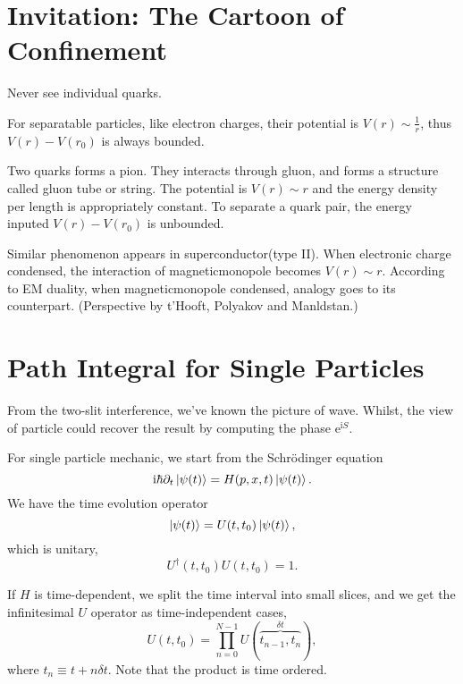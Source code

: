 \section{Invitation: The Cartoon of Confinement}
Never see individual quarks.

For separatable particles, like electron charges, their potential is 
$V(r) \sim \frac{1}{r}$, thus $V(r)-V(r_0)$ is always bounded.

Two quarks forms a pion. They interacts through gluon, and forms a structure called gluon tube or string. The potential is $V(r) \sim r$ and the energy density per length is appropriately constant. To separate a quark pair, the energy inputed $V(r)-V(r_0)$ is unbounded.

Similar phenomenon appears in superconductor(type II). When electronic charge condensed, the interaction of magneticmonopole becomes $V(r) \sim r$. According to EM duality, when magneticmonopole condensed, analogy goes to its counterpart. (Perspective by t'Hooft, Polyakov and Manldstan.)

\section{Path Integral for Single Particles}
From the two-slit interference, we've known the picture of wave. Whilst, the view of particle could recover the result by computing the phase $\mathrm{e}^{\mathrm{i} S}$.

For single particle mechanic, we start from the Schr\"odinger equation
\begin{equation}
  \mathrm{i} \hbar \partial_t \ket{\psi(t)} = H(p,x,t) \ket{\psi(t)}.
\end{equation}
We have the time evolution operator
\begin{equation}
  \ket{\psi(t)}=U(t,t_0)\ket{\psi(t)},
\end{equation}
which is unitary,
\begin{equation}
  U^{\dagger}(t,t_0) U(t,t_0) = 1.
\end{equation}

If $H$ is time-dependent, we split the time interval into small slices, and we get the infinitesimal $U$ operator as time-independent cases,
\begin{equation}
  U(t,t_0) = \prod_{n=0}^{N-1} U(\overbrace{t_{n-1}, t_{n}}^{\delta t}),
\end{equation}
where $t_n \equiv t + n \delta t$. Note that the product is time ordered.


